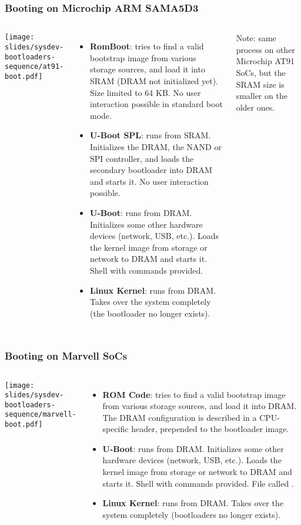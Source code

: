 \begin{frame}
  \frametitle{Booting on Microchip ARM SAMA5D3}
  \begin{columns}
    \texttt{[image: slides/sysdev-bootloaders-sequence/at91-boot.pdf]}
    \footnotesize
    \begin{itemize}
    \item {\bf RomBoot}: tries to find a valid bootstrap image from
      various storage sources, and load it into SRAM (DRAM not
      initialized yet). Size limited to 64 KB. No user interaction
      possible in standard boot mode.
    \item {\bf U-Boot SPL}: runs from SRAM. Initializes the DRAM,
      the NAND or SPI controller, and loads the secondary bootloader
      into DRAM and starts it. No user interaction possible.
    \item {\bf U-Boot}: runs from DRAM. Initializes some other hardware
      devices (network, USB, etc.).  Loads the kernel image from
      storage or network to DRAM and starts it. Shell with commands
      provided.
    \item {\bf Linux Kernel}: runs from DRAM. Takes over the system
      completely (the bootloader no longer exists).
    \end{itemize}
    Note: same process on other Microchip AT91 SoCs, but the
    SRAM size is smaller on the older ones.
  \end{columns}
\end{frame}

\begin{frame}
  \frametitle{Booting on Marvell SoCs}
  \begin{columns}
    \texttt{[image: slides/sysdev-bootloaders-sequence/marvell-boot.pdf]}
    \footnotesize
    \begin{itemize}
    \item {\bf ROM Code}: tries to find a valid bootstrap image from
      various storage sources, and load it into DRAM. The DRAM
      configuration is described in a CPU-specific header, prepended
      to the bootloader image.
    \item {\bf U-Boot}: runs from DRAM. Initializes some other hardware
      devices (network, USB, etc.).  Loads the kernel image from
      storage or network to DRAM and starts it. Shell with commands
      provided. File called .
    \item {\bf Linux Kernel}: runs from DRAM. Takes over the system
      completely (bootloaders no longer exists).
    \end{itemize}
  \end{columns}
\end{frame}


